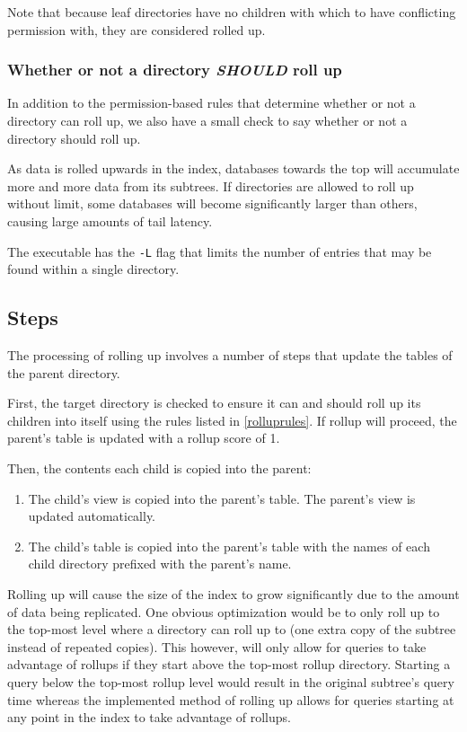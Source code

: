 Note that because leaf directories have no children with which to have
conflicting permission with, they are considered rolled up.

\subsubsection{Whether or not a directory {\it SHOULD} roll up}
In addition to the permission-based rules that determine whether or
not a directory can roll up, we also have a small check to say whether
or not a directory should roll up.

As data is rolled upwards in the index, databases towards the top will
accumulate more and more data from its subtrees. If directories are
allowed to roll up without limit, some databases will become
significantly larger than others, causing large amounts of tail
latency.

The \rollup executable has the \texttt{-L} flag that limits the number
of entries that may be found within a single directory.

\subsection{Steps}
The processing of rolling up involves a number of steps that update
the tables of the parent directory.

First, the target directory is checked to ensure it can and should
roll up its children into itself using the rules listed in
\ref{rolluprules}. If rollup will proceed, the parent's \summary table
is updated with a rollup score of 1.

Then, the contents each child is copied into the parent:

\begin{enumerate}
\item The child's \pentries view is copied into the parent's
  \pentriesrollup table. The parent's \pentries view is updated
  automatically.
\item The child's \summary table is copied into the parent's \summary
  table with the names of each child directory prefixed with the parent's
  name.
\end{enumerate}

Rolling up will cause the size of the index to grow significantly due
to the amount of data being replicated. One obvious optimization would
be to only roll up to the top-most level where a directory can roll up
to (one extra copy of the subtree instead of repeated copies). This
however, will only allow for queries to take advantage of rollups if
they start above the top-most rollup directory. Starting a query below
the top-most rollup level would result in the original subtree's query
time whereas the implemented method of rolling up allows for queries
starting at any point in the index to take advantage of rollups.

